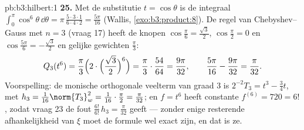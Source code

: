 \begin{solution}{pb:b3:hilbert:1}
\textbf{25.} Met de substitutie $t = \cos\theta$ is de integraal
$\int_0^\pi\cos^6\theta\,\dd\theta =
\pi\,\frac{5\cdot3\cdot1}{6\cdot4\cdot2} = \frac{5\pi}{16}$
(Wallis, \cref{exo:b3:product:8}). De regel van
Chebyshev--Gauss met $n = 3$ (vraag 17) heeft de knopen
$\cos\frac\pi6 = \frac{\sqrt3}2$, $\cos\frac\pi2 = 0$ en
$\cos\frac{5\pi}6 = -\frac{\sqrt3}2$ en gelijke gewichten
$\frac\pi3$:
\[
Q_3(t^6) = \frac\pi3\Bigl(2\cdot\Bigl(\frac{\sqrt3}2
\Bigr)^{6}\Bigr) = \frac\pi3\cdot\frac{54}{64}
= \frac{9\pi}{32},
\qquad
\frac{5\pi}{16} - \frac{9\pi}{32} = \frac\pi{32} .
\]
Voorspelling: de monische orthogonale veelterm van graad $3$ is
$2^{-2}T_3 = t^3 - \frac34t$, met $h_3 = \frac1{16}\norm{T_3}_w^2
= \frac1{16}\cdot\frac\pi2 = \frac\pi{32}$; en $f = t^6$ heeft
constante $f^{(6)} = 720 = 6!$, zodat vraag 23 de fout
$\frac{6!}{6!}\,h_3 = \frac\pi{32}$ geeft --- zonder enige
resterende afhankelijkheid van $\xi$ moet de formule wel exact
zijn, en dat is ze.
\end{solution}
